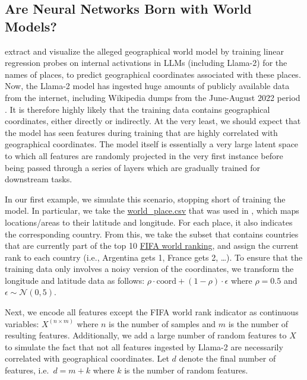 \documentclass{article}
\theoremstyle{plain}
\theoremstyle{definition}
\theoremstyle{remark}
\begin{document}
\subsection{Are Neural Networks Born with World Models?}\label{example-deep-learning}

\citet{gurnee2023languagev2} extract and visualize the alleged geographical world model by training linear regression probes on internal activations in LLMs (including Llama-2) for the names of places, to predict geographical coordinates associated with these places. Now, the Llama-2 model has ingested huge amounts of publicly available data from the internet, including Wikipedia dumps from the June-August 2022 period \citep{touvron2023llama}. It is therefore highly likely that the training data contains geographical coordinates, either directly or indirectly. At the very least, we should expect that the model has seen features during training that are highly correlated with geographical coordinates. The model itself is essentially a very large latent space to which all features are randomly projected in the very first instance before being passed through a series of layers which are gradually trained for downstream tasks.

In our first example, we simulate this scenario, stopping short of training the model. In particular, we take the \href{https://github.com/wesg52/world-models/blob/main/data/entity_datasets/world_place.csv}{world\_place.csv} that was used in \citet{gurnee2023languagev2}, which maps locations/areas to their latitude and longitude. For each place, it also indicates the corresponding country. From this, we take the subset that contains countries that are currently part of the top 10 \href{https://www.fifa.com/fifa-world-ranking/men?dateId=id14142}{FIFA world ranking}, and assign the current rank to each country (i.e., Argentina gets 1, France gets 2, \ldots{}). To ensure that the training data only involves a noisy version of the coordinates, we transform the longitude and latitude data as follows: \(\rho \cdot \text{coord} + (1-\rho) \cdot \epsilon\) where \(\rho=0.5\) and \(\epsilon \sim \mathcal{N}(0, 5)\).

Next, we encode all features except the FIFA world rank indicator as continuous variables: \(X^{(n \times m)}\) where \(n\) is the number of samples and \(m\) is the number of resulting features. Additionally, we add a large number of random features to \(X\) to simulate the fact that not all features ingested by Llama-2 are necessarily correlated with geographical coordinates. Let \(d\) denote the final number of features, i.e.~\(d=m+k\) where \(k\) is the number of random features.
\end{document}
